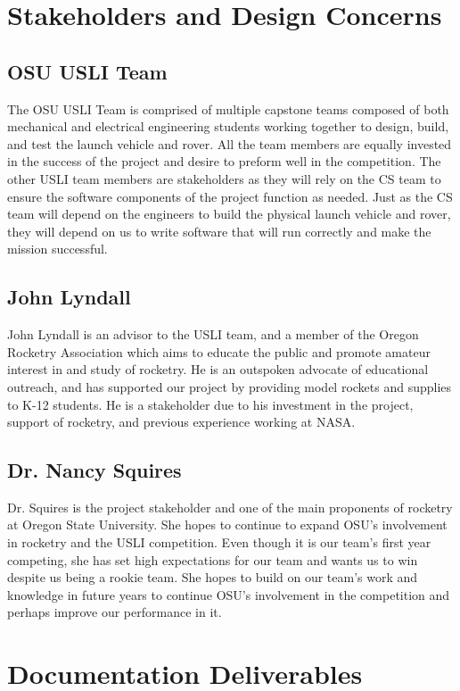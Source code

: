 \documentclass[onecolumn, draftclsnofoot,10pt, compsoc]{IEEEtran}
\begin{document}
\section{Stakeholders and Design Concerns}
\subsection{OSU USLI Team}
The OSU USLI Team is comprised of multiple capstone teams composed of both mechanical and electrical engineering students working together to design, build, and test the launch vehicle and rover. All the team members are equally invested in the success of the project and desire to preform well in the competition. The other USLI team members are stakeholders as they will rely on the CS team to ensure the software components of the project function as needed. Just as the CS team will depend on the engineers to build the physical launch vehicle and rover, they will depend on us to write software that will run correctly and make the mission successful.
\subsection{John Lyndall}
John Lyndall is an advisor to the USLI team, and a member of the Oregon Rocketry Association which aims to educate the public and promote amateur interest in and study of rocketry. He is an outspoken advocate of educational outreach, and has supported our project by providing model rockets and supplies to K-12 students. He is a stakeholder due to his investment in the project, support of rocketry, and previous experience working at NASA. 
\subsection{Dr. Nancy Squires}
Dr. Squires is the project stakeholder and one of the main proponents of rocketry at Oregon State University. She hopes to continue to expand OSU's involvement in rocketry and the USLI competition. Even  though it is our team's first year competing, she has set high expectations for our team and wants us to win despite us being a rookie team. She hopes to build on our team's work and knowledge in future years to continue OSU's involvement in the competition and perhaps improve our performance in it.

\section{Documentation Deliverables}
\end{document}
